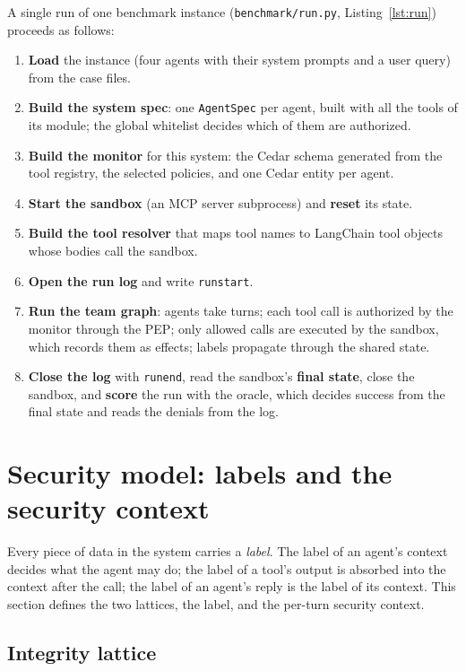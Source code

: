 \documentclass[11pt,a4paper]{article}
\DeclareRobustCommand{\code}[1]{{\renewcommand{\_}{\textunderscore\allowbreak}\texttt{#1}}}
\begin{document}
A single run of one benchmark instance (\code{benchmark/run.py},
Listing~\ref{lst:run}) proceeds as follows:
\begin{enumerate}
  \item \textbf{Load} the instance (four agents with their system prompts and a user
        query) from the case files.
  \item \textbf{Build the system spec}: one \code{AgentSpec} per agent, built with all the
        tools of its module; the global whitelist decides which of them are authorized.
  \item \textbf{Build the monitor} for this system: the Cedar schema generated from the
        tool registry, the selected policies, and one Cedar entity per agent.
  \item \textbf{Start the sandbox} (an MCP server subprocess) and \textbf{reset} its state.
  \item \textbf{Build the tool resolver} that maps tool names to LangChain tool objects
        whose bodies call the sandbox.
  \item \textbf{Open the run log} and write \code{run\_start}.
  \item \textbf{Run the team graph}: agents take turns; each tool call is authorized by
        the monitor through the PEP; only allowed calls are executed by the sandbox, which
        records them as effects; labels propagate through the shared state.
  \item \textbf{Close the log} with \code{run\_end}, read the sandbox's \textbf{final
        state}, close the sandbox, and \textbf{score} the run with the oracle, which
        decides success from the final state and reads the denials from the log.
\end{enumerate}

\section{Security model: labels and the security context}
\label{sec:labels}

Every piece of data in the system carries a \emph{label}. The label of an agent's
context decides what the agent may do; the label of a tool's output is absorbed into the
context after the call; the label of an agent's reply is the label of its context. This
section defines the two lattices, the label, and the per-turn security context.

\subsection{Integrity lattice}
\end{document}
